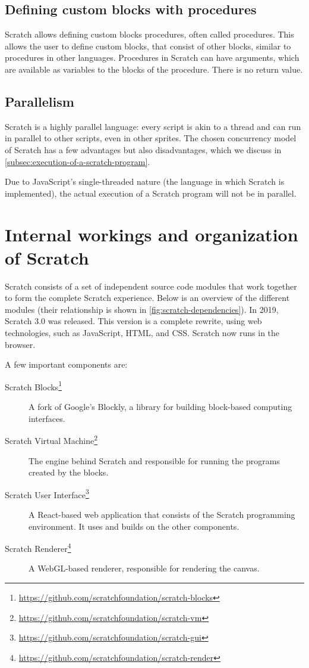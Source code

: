 \documentclass[../main]{subfiles}
\begin{document}
\subsection{Defining custom blocks with procedures}\label{subsec:defining-custom-blocks-with-procedures}

Scratch allows defining \textcolor{scrmoreblocks}{custom blocks} procedures, often called procedures.
This allows the user to define custom blocks, that consist of other blocks, similar to procedures in other languages.
Procedures in Scratch can have arguments, which are available as variables to the blocks of the procedure.
There is no return value.

\subsection{Parallelism}\label{subsec:parallelism}

Scratch is a highly parallel language: every script is akin to a thread and can run in parallel to other scripts, even in other sprites.
The chosen concurrency model of Scratch has a few advantages but also disadvantages, which we discuss in \vref{subsec:execution-of-a-scratch-program}.

Due to JavaScript's single-threaded nature (the language in which Scratch is implemented), the actual execution of a Scratch program will not be in parallel.

\section{Internal workings and organization of Scratch}\label{sec:scratch-internal}

Scratch consists of a set of independent source code modules that work together to form the complete Scratch experience.
Below is an overview of the different modules (their relationship is shown in \vref{fig:scratch-dependencies}).
In 2019, Scratch 3.0 was released.
This version is a complete rewrite, using web technologies, such as JavaScript, HTML, and CSS.
Scratch now runs in the browser.

A few important components are:

\begin{description}
    \item[Scratch Blocks\footnote{\url{https://github.com/scratchfoundation/scratch-blocks}}] A fork of Google's Blockly, a library for building block-based computing interfaces.
    \item[Scratch Virtual Machine\footnote{\url{https://github.com/scratchfoundation/scratch-vm}}] The engine behind Scratch and responsible for running the programs created by the blocks.
    \item[Scratch User Interface\footnote{\url{https://github.com/scratchfoundation/scratch-gui}}] A React-based web application that consists of the Scratch programming environment. It uses and builds on the other components.
    \item[Scratch Renderer\footnote{\url{https://github.com/scratchfoundation/scratch-render}}] A WebGL-based renderer, responsible for rendering the canvas.
\end{description}
\end{document}
